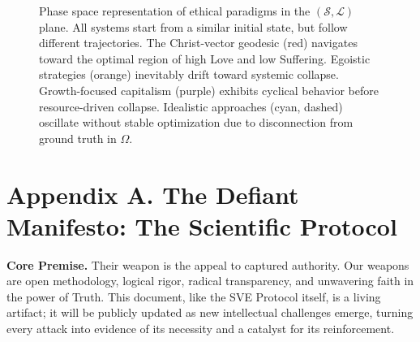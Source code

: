 \documentclass[11pt,a4paper]{article}
\begin{document}
\begin{figure}[h!]
\caption{Phase space representation of ethical paradigms in the $(\mathcal{S}, \mathcal{L})$ plane. All systems start from a similar initial state, but follow different trajectories. The Christ-vector geodesic (red) navigates toward the optimal region of high Love and low Suffering. Egoistic strategies (orange) inevitably drift toward systemic collapse. Growth-focused capitalism (purple) exhibits cyclical behavior before resource-driven collapse. Idealistic approaches (cyan, dashed) oscillate without stable optimization due to disconnection from ground truth in $\Omega$.}
\label{fig:phase_space}
\end{figure}


\clearpage %



\section*{Appendix A. The Defiant Manifesto: The Scientific Protocol}
\label{app:manifesto}

\vspace{1em}

\noindent{}

\vspace{1.5em}

\noindent\textbf{\textcolor{headercolor}{Core Premise.}} Their weapon is the appeal to captured authority. Our weapons are open methodology, logical rigor, radical transparency, and unwavering faith in the power of Truth. This document, like the SVE Protocol itself, is a living artifact; it will be publicly updated as new intellectual challenges emerge, turning every attack into evidence of its necessity and a catalyst for its reinforcement.
\end{document}
